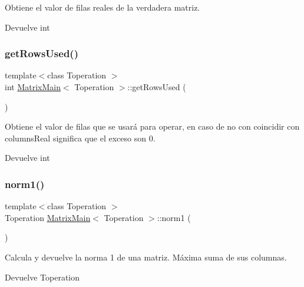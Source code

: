 Obtiene el valor de filas reales de la verdadera matriz. 

\begin{DoxyReturn}{Devuelve}
int 
\end{DoxyReturn}
\mbox{\label{classMatrixMain_a51fbed871925f5f34b40b0a264b4eff6}} 
\subsubsection{\texorpdfstring{get\+Rows\+Used()}{getRowsUsed()}}
{\footnotesize\ttfamily template$<$class Toperation $>$ \\
int \hyperlink{classMatrixMain}{Matrix\+Main}$<$ Toperation $>$\+::get\+Rows\+Used (\begin{DoxyParamCaption}{ }\end{DoxyParamCaption})}



Obtiene el valor de filas que se usará para operar, en caso de no con coincidir con columns\+Real significa que el exceso son 0. 

\begin{DoxyReturn}{Devuelve}
int 
\end{DoxyReturn}
\mbox{\label{classMatrixMain_ad78ea69222a13a6ef322573b82427787}} 
\subsubsection{\texorpdfstring{norm1()}{norm1()}}
{\footnotesize\ttfamily template$<$class Toperation $>$ \\
Toperation \hyperlink{classMatrixMain}{Matrix\+Main}$<$ Toperation $>$\+::norm1 (\begin{DoxyParamCaption}{ }\end{DoxyParamCaption})}



Calcula y devuelve la norma 1 de una matriz. Máxima suma de sus columnas. 

\begin{DoxyReturn}{Devuelve}
Toperation 
\end{DoxyReturn}
\mbox{\label{classMatrixMain_a89bb905f0b2d52709331ff0e3ec6733b}} 
